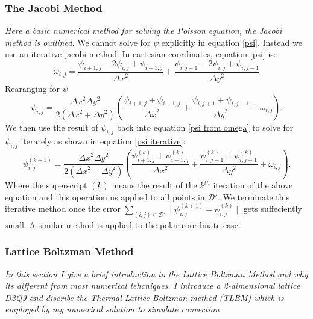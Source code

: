 \documentclass{article}
\begin{document}
\subsubsection*{The Jacobi Method}
{\it{Here a basic numerical method for solving the Poisson equation, the Jacobi method is outlined.}}
We cannot solve for $\psi$ explicitly in equation \ref{psi}. Instead we use an iterative jacobi method. In cartesian coordinates, equation \ref{psi} is:
\begin{equation}
	\omega_{i,j} = \frac{\psi_{i+1,j} - 2 \psi_{i,j} + \psi_{i-1,j}  }{{\Delta x}^2} + \frac{\psi_{i,j+1} - 2 \psi_{i,j} + \psi_{i,j-1}  }{{\Delta y}^2}
	\label{psi disc}
\end{equation}
Rearanging for $\psi$
\begin{equation}
	\psi_{i,j} = \frac{{\Delta x}^2 {\Delta y}^2  }{2({\Delta x}^2  + {\Delta y}^2)} (\frac{\psi_{i+1,j} +\psi_{i-1,j} }{{\Delta x}^2} + \frac{\psi_{i,j+1} +\psi_{i,j-1}  }{{\Delta y}^2 }  + \omega_{i,j}).
	\label{psi from omega}
\end{equation}
We then use the result of $\psi_{i,j}$ back into equation \ref{psi from omega} to solve for $\psi_{i,j}$ iterately as shown in equation \ref{psi iterative}:
\begin{equation}
	\psi_{i,j}^{(k+1)} = \frac{{\Delta x}^2 {\Delta y}^2  }{2({\Delta x}^2  + {\Delta y}^2)} (\frac{\psi_{i+1,j}^{(k)} +\psi_{i-1,j}^{(k)}  }{{\Delta x}^2} + \frac{\psi_{i,j+1}^{(k)} +\psi_{i,j-1}^{(k)}  }{{\Delta y}^2 } + \omega_{i,j}).
	\label{psi iterative}
\end{equation}
Where the superscript $(k)$ means the result of the $k^{th}$ iteration of the above equation and this operation us applied to all points in $\mathcal{D}'$.
 We terminate this iterative method once the error $\sum_{(i,j) \in \mathcal{D'}} \mid \psi_{i,j}^{(k+1)} - \psi_{i,j}^{(k)} \mid$ gets suffeciently small. A similar method is applied to the polar coordinate case. 

\subsubsection*{Lattice Boltzman Method}
{\it{In this section I give a brief introduction to the Lattice Boltzman Method and why its different from most numerical tehcniques. I introduce a 2-dimensional lattice D2Q9 and discribe the Thermal Lattice Boltzman method (TLBM) which is employed by my numerical solution to simulate convection.}}
\vspace{0.3cm}
\end{document}
